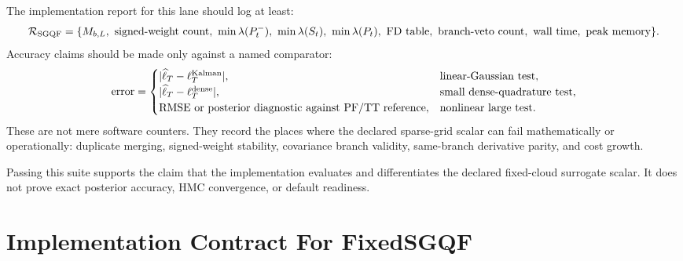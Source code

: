 The implementation report for this lane should log at least:
\begin{equation}
  \mathcal R_{\rm SGQF}=
  \{M_{b,L},\ \text{signed-weight count},\ \min\lambda(P_t^-),\ \min\lambda(S_t),\
    \min\lambda(P_t),\ \text{FD table},\ \text{branch-veto count},\
    \text{wall time},\ \text{peak memory}\}.
  \label{eq:bf-hd-sgqf-report-object}
\end{equation}
Accuracy claims should be made only against a named comparator:
\begin{equation}
  \text{error}
  =
  \begin{cases}
  |\widehat\ell_T-\ell_T^{\rm Kalman}|, & \text{linear-Gaussian test},\\
  |\widehat\ell_T-\ell_T^{\rm dense}|, & \text{small dense-quadrature test},\\
  \text{RMSE or posterior diagnostic against PF/TT reference}, & \text{nonlinear large test}.
  \end{cases}
  \label{eq:bf-hd-sgqf-comparator-errors}
\end{equation}
These are not mere software counters.  They record the places where the declared
sparse-grid scalar can fail mathematically or operationally: duplicate merging,
signed-weight stability, covariance branch validity, same-branch derivative
parity, and cost growth.

Passing this suite supports the claim that the implementation evaluates and
differentiates the declared fixed-cloud surrogate scalar.  It does not prove
exact posterior accuracy, HMC convergence, or default readiness.

\section{Implementation Contract For FixedSGQF}
\label{sec:bf-hd-sgqf-implementation-contract}

